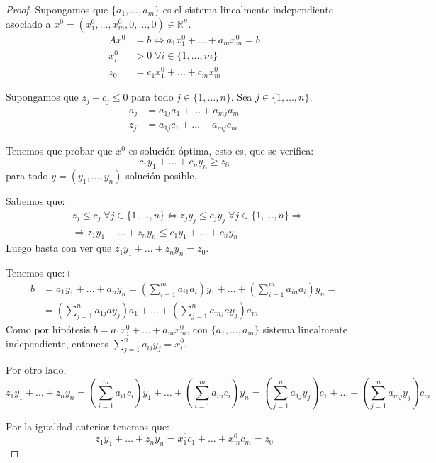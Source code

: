 \begin{proof}
    Supongamos que $\{a_1, \dots, a_m\}$ es el sistema linealmente independiente asociado a $x^0 = (x^0_1, \dots, x^0_m, 0, \dots, 0) \in \mathbb{R}^n$.
    \begin{align*}
        Ax^0  & = b \Leftrightarrow a_1x^0_1 + \dots + a_mx^0_m = b \\
        x^0_i & > 0 \; \forall i \in \{1, \dots, m\}                \\
        z_0   & = c_1x^0_1 + \dots + c_mx^0_m
    \end{align*}

    Supongamos que $z_j - c_j \leq 0$ para todo $j \in \{1, \dots, n\}$.
    Sea $j \in \{1, \dots, n\}$,
    \begin{align*}
        a_j & = a_{1j}a_1 + \dots + a_{mj}a_m \\
        z_j & = a_{1j}c_1 + \dots + a_{mj}c_m
    \end{align*}

    Tenemos que probar que $x^0$ es solución óptima, esto es, que se verifica:
    $$c_1y_1 + \dots + c_ny_n \geq z_0$$
    para todo $y = (y_1, \dots, y_n)$ solución posible.

    Sabemos que:
    \begin{align*}
         & z_j \leq c_j \; \forall j \in \{1, \dots, n\} \Leftrightarrow z_jy_j \leq c_jy_j \; \forall j \in \{1, \dots, n\} \Rightarrow \\
         & \Rightarrow z_1y_1 + \dots + z_ny_n \leq c_1y_1 + \dots + c_ny_n
    \end{align*}
    Luego basta con ver que $z_1y_1 + \dots + z_ny_n = z_0$.

    Tenemos que:+
    \begin{align*}
        b & = a_1y_1 + \dots + a_ny_n = \left(\sum_{i=1}^ma_{i1}a_i\right)y_1 + \dots + \left(\sum_{i=1}^ma_{in}a_i\right)y_n = \\
          & = \left(\sum_{j=1}^na_{1j}ay_j\right)a_1 + \dots + \left(\sum_{j=1}^na_{mj}ay_j\right)a_m
    \end{align*}
    Como por hipótesis $b = a_1x^0_1 + \dots + a_mx^0_m$, con $\{a_1, \dots, a_m\}$ sistema linealmente independiente, entonces $\sum_{j=1}^n a_{ij}y_j = x^0_i$.

    Por otro lado,
    $$z_1y_1 + \dots + z_ny_n = \left(\sum_{i=1}^ma_{i1}c_i\right)y_1 + \dots + \left(\sum_{i=1}^ma_{in}c_i\right)y_n = \left(\sum_{j=1}^na_{1j}y_j\right)c_1 + \dots + \left(\sum_{j=1}^na_{mj}y_j\right)c_m$$

    Por la igualdad anterior tenemos que:
    $$z_1y_1 + \dots + z_ny_n = x^0_1c_1 + \dots + x^0_mc_m = z_0$$
\end{proof}

